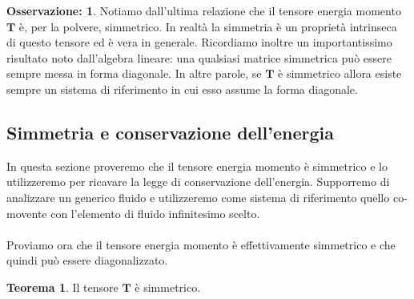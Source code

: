 \documentclass[]{report}
\theoremstyle{definition}
\theoremstyle{Theorem}
\newtheorem{Theo}[Def]{Teorema}
\theoremstyle{definition}
\theoremstyle{definition}
\theoremstyle{definition}
\newtheorem{Obs}[Def]{Osservazione:}
\begin{document}
\begin{Obs}
	Notiamo dall'ultima relazione che il tensore energia momento $\textbf{T}$ è, per la polvere, simmetrico. In realtà la simmetria è un proprietà intrinseca di questo tensore ed è vera in generale. Ricordiamo inoltre un importantissimo risultato noto dall'algebra lineare: una qualsiasi matrice simmetrica può essere sempre messa in forma diagonale. In altre parole, se $\textbf{T}$ è simmetrico allora esiste sempre un sistema di riferimento in cui esso assume la forma diagonale.
\end{Obs}
\subsection{Simmetria e conservazione dell'energia}
In questa sezione proveremo che il tensore energia momento è simmetrico e lo utilizzeremo per ricavare la legge di conservazione dell'energia. Supporremo di analizzare un generico fluido e utilizzeremo come sistema di riferimento quello co-movente con l'elemento di fluido infinitesimo scelto.\\ \\
Proviamo ora che il tensore energia momento è effettivamente simmetrico e che quindi può essere diagonalizzato.
\begin{Theo}
	Il tensore $\textbf{T}$ è simmetrico.
\end{Theo}
\end{document}
